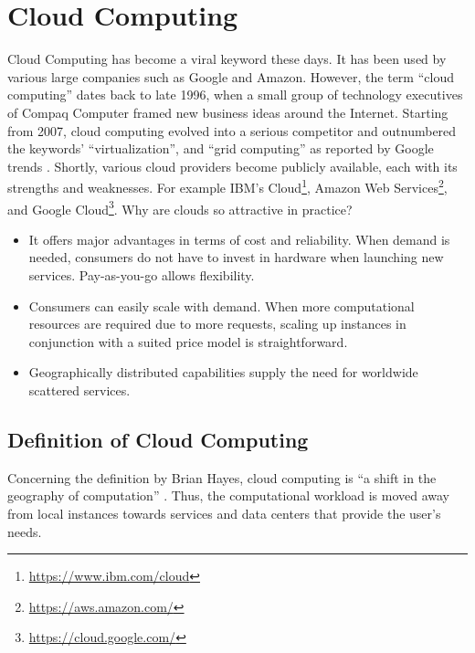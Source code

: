 \section{Cloud Computing}
\label{sec:cloud-computing}

Cloud Computing has become a viral keyword these days.
It has been used by various large companies such as Google and Amazon.
However, the term \enquote{cloud computing} dates back to late 1996, when a small group of technology executives of Compaq Computer framed new business ideas around the Internet.\cite{regalado2020}
Starting from 2007, cloud computing evolved into a serious competitor and outnumbered the keywords' \enquote{virtualization}, and \enquote{grid computing} as reported by Google trends \cite{Wang2010}.
Shortly, various cloud providers become publicly available, each with its strengths and weaknesses.
For example IBM's Cloud\footnote{\url{https://www.ibm.com/cloud}}, Amazon Web Services\footnote{\url{https://aws.amazon.com/}}, and Google Cloud\footnote{\url{https://cloud.google.com/}}.
Why are clouds so attractive in practice?

\begin{itemize}
    \item It offers major advantages in terms of cost and reliability.
    When demand is needed, consumers do not have to invest in hardware when launching new services.
    Pay-as-you-go allows flexibility.
    \item Consumers can easily scale with demand.
    When more computational resources are required due to more requests, scaling up instances in conjunction with a suited price model is straightforward.
    \item Geographically distributed capabilities supply the need for worldwide scattered services.
\end{itemize}

\subsection{Definition of Cloud Computing}

Concerning the definition by Brian Hayes, cloud computing is \enquote{a shift in the geography of computation} \cite{hayes2008}.
Thus, the computational workload is moved away from local instances towards services and data centers that provide the user's needs\cite{Armbrust2010}.

